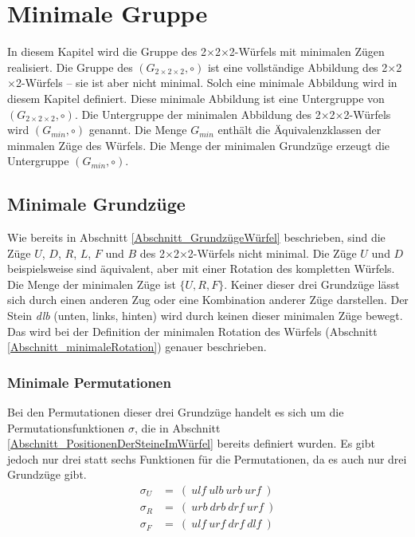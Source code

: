 \documentclass[12pt,a4paper, usenames, dvipsnames]{article}
\theoremstyle{mystyle}
\theoremstyle{definition}
\newcommand{\Gtwo}{\ensuremath{G_{2\times 2\times 2}}}
\newcommand{\Ttwo}{2$\times$2$\times$2-}
\begin{document}
\section{Minimale Gruppe}
\label{Kapitel_MinUntergruppe}

In diesem Kapitel wird die Gruppe des \Ttwo Würfels mit minimalen Zügen realisiert. Die Gruppe des $(\Gtwo, \circ)$ ist eine vollständige Abbildung des \Ttwo Würfels -- sie ist aber nicht minimal. Solch eine minimale Abbildung wird in diesem Kapitel definiert. Diese minimale Abbildung ist eine Untergruppe von $(\Gtwo, \circ)$.
Die Untergruppe der minimalen Abbildung des \Ttwo Würfels wird $(G_{min}, \circ)$ genannt. Die Menge $G_{min}$ enthält die Äquivalenzklassen der minmalen Züge des Würfels.
Die Menge der minimalen Grundzüge erzeugt die Untergruppe $(G_{min}, \circ)$.

%
%
%
%
%
%
%
%
%
%
%
%
%
%
%
%
%
%
%
%
\subsection{Minimale Grundzüge}
\label{Abschnitt_MinimalePermutationen}
\label{Abschnitt_MinimaleGrundzüge}

Wie bereits in Abschnitt \ref{Abschnitt_GrundzügeWürfel} beschrieben, sind die Züge $U$, $D$, $R$, $L$, $F$ und $B$ des \Ttwo Würfels nicht minimal. Die Züge $U$ und $D$ beispielsweise sind äquivalent, aber mit einer Rotation des kompletten Würfels. 
Die Menge der minimalen Züge ist $\{ U, R, F\}$. Keiner dieser drei Grundzüge lässt sich durch einen anderen Zug oder eine Kombination anderer Züge darstellen. Der Stein \textit{dlb} (unten, links, hinten) wird durch keinen dieser minimalen Züge bewegt. Das wird bei der Definition der minimalen Rotation des Würfels (Abschnitt \ref{Abschnitt_minimaleRotation}) genauer beschrieben.

\subsubsection*{Minimale Permutationen}

Bei den Permutationen dieser drei Grundzüge handelt es sich um die Permutationsfunktionen $\sigma$, die in Abschnitt \ref{Abschnitt_PositionenDerSteineImWürfel} bereits definiert wurden. Es gibt jedoch nur drei statt sechs Funktionen für die Permutationen, da es auch nur drei Grundzüge gibt.
\begin{align*}
\sigma_U & =\ ( \ \textit{ulf} \ \textit{ulb} \ \textit{urb} \ \textit{urf} \ ) \\
\sigma_R & =\ ( \ \textit{urb} \ \textit{drb} \ \textit{drf} \ \textit{urf} \ ) \\
\sigma_F & =\ ( \ \textit{ulf} \ \textit{urf} \ \textit{drf} \ \textit{dlf} \ ) 
\end{align*}
\end{document}
